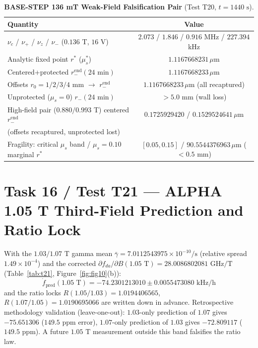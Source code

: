 \documentclass[12pt,a4paper]{article}
\begin{document}
\begin{table}[!htbp]
\centering
\footnotesize
\setlength{\tabcolsep}{3pt}
\caption{\textbf{BASE-STEP 136 mT Weak-Field Falsification Pair} (Test T20, $t=1440\text{ s}$).}
\label{tab:t20}
\vspace{0.1cm}
\begin{tabular}{@{}l|c@{}}
\hline
Quantity & Value \\
\hline
$\nu_c$ / $\nu_+$ / $\nu_z$ / $\nu_-$ ($0.136$ T, $16$ V) & $2.073$ / $1.846$ / $0.916$ MHz / $227.394$ kHz \\
Analytic fixed point $r^*$ ($\mu_s^*$) & $1.1167668231\,\mu\text{m}$ \\
Centered+protected $r_-^{\mathrm{end}}(24\text{ min})$ & $1.1167668233\,\mu\text{m}$ \\
Offsets $r_0=1/2/3/4\text{ mm}$ $\to$ $r_-^{\mathrm{end}}$ & $1.1167668233\,\mu\text{m}$ (all recaptured) \\
Unprotected ($\mu_s=0$) $r_-(24\text{ min})$ & $>5.0$ mm (wall loss) \\
High-field pair ($0.880/0.993$ T) centered $r_-^{\mathrm{end}}$ & $0.1725929420$ / $0.1529524641\,\mu\text{m}$ \\
(offsets recaptured, unprotected lost) & \\
Fragility: critical $\mu_s$ band / $\mu_s=0.10$ marginal $r^*$ & $[0.05, 0.15]$ / $90.5544376963\,\mu\text{m}$ ($<0.5$ mm) \\
\hline
\end{tabular}
\end{table}

\section{Task 16 / Test T21 --- ALPHA 1.05 T Third-Field Prediction and Ratio Lock}

With the $1.03/1.07\text{ T}$ gamma mean $\bar{\gamma}=7.0112543975\times 10^{-10}\text{/s}$ (relative spread $1.49\times 10^{-4}$) and the corrected $\partial f_{da}/\partial B(1.05\text{ T})=28.0086802081\text{ GHz/T}$ (Table~\ref{tab:t21}, Figure~\ref{fig:fig10}(b)):
\begin{equation}
\boxed{\dot{f}_{\mathrm{pred}}(1.05\text{ T}) = -74.2301213010 \pm 0.0055473080\text{ kHz/h}}
\label{eq:t21pred}
\end{equation}
and the ratio locks $R(1.05/1.03)=1.0194406565$, $R(1.07/1.05)=1.0190695066$ are written down in advance. Retrospective methodology validation (leave-one-out): $1.03$-only prediction of $1.07$ gives $-75.651306$ ($149.5\text{ ppm}$ error), $1.07$-only prediction of $1.03$ gives $-72.809117$ ($149.5\text{ ppm}$). A future $1.05\text{ T}$ measurement outside this band falsifies the ratio law.
\end{document}
